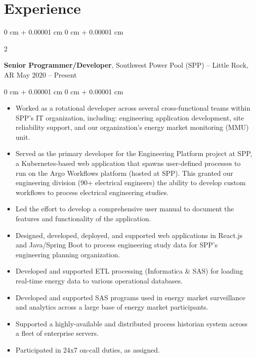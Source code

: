 \documentclass[10pt, letterpaper]{article}
\newenvironment{highlights}{
    \begin{itemize}[
        topsep=0.10 cm,
        parsep=0.10 cm,
        partopsep=0pt,
        itemsep=0pt,
        leftmargin=0 cm + 10pt
    ]
}{
    \end{itemize}
} %
\newenvironment{onecolentry}{
    \begin{adjustwidth}{
        0 cm + 0.00001 cm
    }{
        0 cm + 0.00001 cm
    }
}{
    \end{adjustwidth}
} %
\newenvironment{twocolentry}[2][]{
    \onecolentry
    \def\secondColumn{#2}
    \setcolumnwidth{\fill, 4.5 cm}
    \begin{paracol}{2}
}{
    \switchcolumn \raggedleft \secondColumn
    \end{paracol}
    \endonecolentry
} %
\begin{document}
    \section{Experience}
    
        \begin{twocolentry}{
            May 2020 – Present
        }
            \textbf{Senior Programmer/Developer}, Southwest Power Pool (SPP) -- Little Rock, AR \end{twocolentry}

        \vspace{0.10 cm}
        \begin{onecolentry}
            \begin{highlights}
                \item Worked as a rotational developer across several cross-functional teams within SPP's IT organization, including: engineering application development, site reliability support, and our organization's energy market monitoring (MMU) unit.
                \item Served as the primary developer for the Engineering Platform project at SPP, a Kubernetes-based web application that spawns user-defined processes to run on the Argo Workflows platform (hosted at SPP). This granted our engineering division (90+ electrical engineers) the ability to develop custom workflows to process electrical engineering studies.
                \item Led the effort to develop a comprehensive user manual to document the features and functionality of the application.
                \item Designed, developed, deployed, and supported web applications in React.js and Java/Spring Boot to process engineering study data for SPP's engineering planning organization.
                \item Developed and supported ETL processing (Informatica \& SAS) for loading real-time energy data to various operational databases.
                \item Developed and supported SAS programs used in energy market surveillance and analytics across a large base of energy market participants.
                \item Supported a highly-available and distributed process historian system across a fleet of enterprise servers.
                \item Participated in 24x7 on-call duties, as assigned.
            \end{highlights}
        \end{onecolentry}
\end{document}
